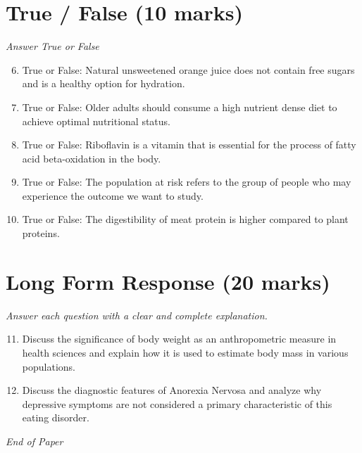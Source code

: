 \documentclass[12pt]{article}
\begin{document}
\section*{True / False (10 marks)}
\textit{Answer True or False}
\begin{enumerate}[label=\arabic*.]
\setcounter{enumi}{5}
\item True or False: Natural unsweetened orange juice does not contain free sugars and is a healthy option for hydration.
\item True or False: Older adults should consume a high nutrient dense diet to achieve optimal nutritional status.
\item True or False: Riboflavin is a vitamin that is essential for the process of fatty acid beta-oxidation in the body.
\item True or False: The population at risk refers to the group of people who may experience the outcome we want to study.
\item True or False: The digestibility of meat protein is higher compared to plant proteins.
\end{enumerate}

\section*{Long Form Response (20 marks)}
\textit{Answer each question with a clear and complete explanation.}
\begin{enumerate}[label=\arabic*.]
\setcounter{enumi}{10}
\item Discuss the significance of body weight as an anthropometric measure in health sciences and explain how it is used to estimate body mass in various populations.
\item Discuss the diagnostic features of Anorexia Nervosa and analyze why depressive symptoms are not considered a primary characteristic of this eating disorder.
\end{enumerate}

\vfill
\noindent\textit{End of Paper}
\end{document}
